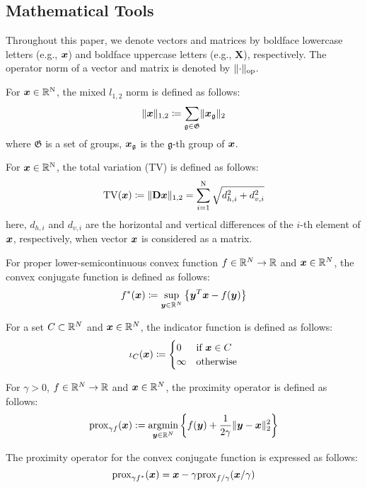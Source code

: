 \subsection{Mathematical Tools}\label{subsec:mathematical-tools}

Throughout this paper, we denote vectors and matrices by boldface lowercase letters (e.g., $\vecx$) and boldface uppercase letters (e.g., $\bm{X}$), respectively.
The operator norm of a vector and matrix is denoted by $\Norm{\cdot}__{\text{op}}$.

For $\vecx \in \realNumber^{\intN}$, the mixed $l_{1,2}$ norm is defined as follows:
\begin{equation} \label{eq:L12NormDefinitionEq} \LOneTwoNormDefinition \end{equation}
where $\mathfrak{G}$ is a set of groups, $\vecx_{\mathfrak{g}}$ is the $\mathfrak{g}$-th group of $\vecx$.

For $\vecx \in \realNumber^{\intN}$, the total variation (TV)\cite{TV} is defined as follows:
\begin{equation} \label{eq:TVDefinitionEq} \TotalVariationDefinition \end{equation}
here, $d_{h,i}$ and $d_{v,i}$ are the horizontal and vertical differences of the $i$-th element of $\vecx$, respectively, when vector $\vecx$ is considered as a matrix.

For proper lower-semicontinuous convex function $f \in \realNumber^N \to \realNumber$ and $\vecx \in \realNumber^N$, the convex conjugate function is defined as follows:
\begin{equation} \label{eq:ConjugateFunctionDefinitionEq} \conjugateFunctionDefinition \end{equation}

For a set $C \subset \realNumber^N$ and $\vecx \in \realNumber^N$, the indicator function is defined as follows:
\begin{equation} \label{eq:IndicatorFunctionDefinitionEq} \indicatorFunctionDefinition \end{equation}

For $\gamma > 0$, $f \in \realNumber^N \to \realNumber$ and $\vecx \in \realNumber^N$, the proximity operator is defined as follows:
\begin{equation} \label{eq:ProximityOperatorDefinitionEq} \proximityOperatorDefinition \end{equation}

The proximity operator for the convex conjugate function is expressed as follows\cite[Theorem 3.1 (ii)]{prox-convex-conjugate-function}:
\begin{equation} \label{eq:ProximityOperatorDefinitionWithConvexConjugateFunctionEq} \proximityOperatorDefinitionWithConvexConjugateFunction \end{equation}

